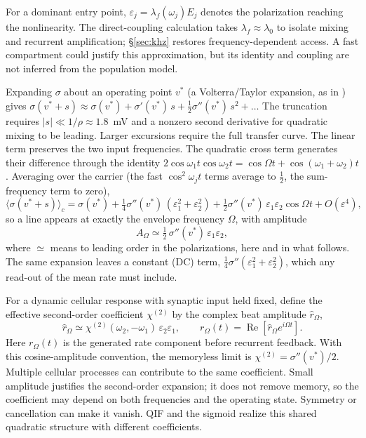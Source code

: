 \documentclass[11pt,a4paper]{article}
\newcommand{\Sig}{\sigma}
\newcommand{\half}{\tfrac{1}{2}}
\begin{document}
For a dominant entry point, $\varepsilon_j=\lambda_f(\omega_j)E_j$ denotes the
polarization reaching the nonlinearity. The direct-coupling calculation takes
$\lambda_f\approx\lambda_0$ to isolate mixing and recurrent amplification;
\S\ref{sec:khz} restores frequency-dependent access. A fast compartment could
justify this approximation, but its identity and coupling are not inferred from
the population model.

Expanding $\Sig$ about an operating point $v^*$ (a Volterra/Taylor expansion, as
in \cite{ruffini2025ham}) gives
$\Sig(v^*+s)\approx\Sig(v^*)+\Sig'(v^*)\,s+\half\Sig''(v^*)\,s^2+\dots$
The truncation requires $|s|\ll1/\rho\approx1.8$~mV and a nonzero second derivative
for quadratic mixing to be leading. Larger excursions require the full transfer curve.
The linear term preserves the two input frequencies. The quadratic cross term
generates their difference through the identity
$2\cos\omega_1t\cos\omega_2t=\cos\Omega t+\cos(\omega_1+\omega_2)t$.
Averaging over the carrier (the fast
$\cos^2\omega_jt$ terms average to $\half$, the sum-frequency term to zero),
\begin{equation}
\big\langle\Sig(v^*+s)\big\rangle_c
=\Sig(v^*)+\tfrac14\Sig''(v^*)\,(\varepsilon_1^2+\varepsilon_2^2)
+\tfrac12\Sig''(v^*)\,\varepsilon_1\varepsilon_2\cos\Omega t+O(\varepsilon^4),
\label{eq:taylor}
\end{equation}
so a line appears at exactly the envelope frequency $\Omega$, with amplitude
\begin{equation}
A_\Omega\simeq\half\,\Sig''(v^*)\,\varepsilon_1\varepsilon_2 ,
\label{eq:demod}
\end{equation}
where $\simeq$ means to leading order in the polarizations, here and in what follows. The
same expansion leaves a constant (DC) term, $\tfrac14\Sig''(\varepsilon_1^2+\varepsilon_2^2)$,
which any read-out of the mean rate must include.

For a dynamic cellular response with synaptic input held fixed, define the
effective second-order coefficient $\chi^{(2)}$ by the complex beat amplitude
$\widehat r_\Omega$,
\[
\widehat r_\Omega\simeq\chi^{(2)}(\omega_2,-\omega_1)\,
\varepsilon_2\varepsilon_1,\qquad
r_\Omega(t)=\operatorname{Re}\!\left[\widehat r_\Omega e^{i\Omega t}\right].
\]
Here $r_\Omega(t)$ is the generated rate component before recurrent feedback.
With this cosine-amplitude convention, the memoryless limit is
$\chi^{(2)}=\Sig''(v^*)/2$. Multiple cellular processes can contribute to the same
coefficient. Small amplitude justifies the second-order expansion; it does not
remove memory, so the coefficient may depend on both frequencies and the
operating state. Symmetry or cancellation can make it vanish. QIF and the sigmoid
realize this shared quadratic structure with different coefficients.
\end{document}
